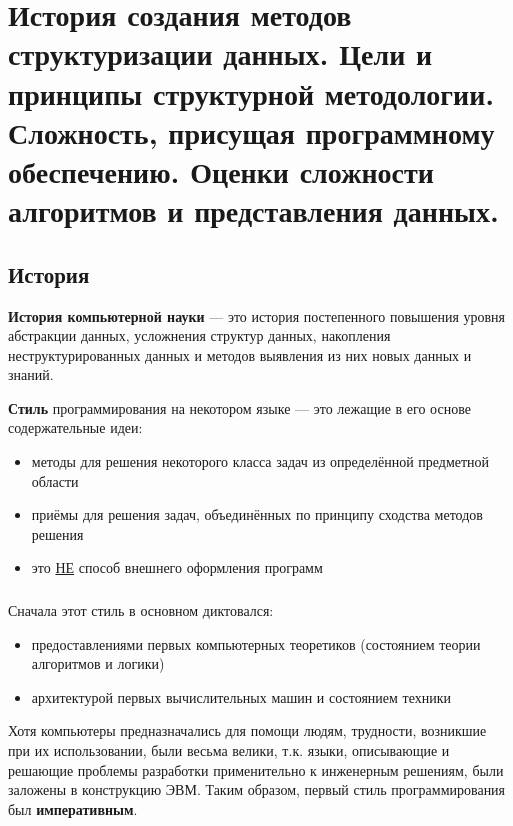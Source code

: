 \section{История создания методов структуризации данных. Цели и принципы структурной методологии. Сложность, присущая программному обеспечению. Оценки сложности алгоритмов и представления данных.}

\subsection{История}
\textbf{История компьютерной науки} --- это история постепенного повышения уровня абстракции данных, усложнения структур данных, накопления неструктурированных данных и методов выявления из них новых данных и знаний.

\textbf{Стиль} программирования на некотором языке ---  это лежащие в его основе содержательные идеи:
\begin{itemize}
  \item методы для решения некоторого класса задач из определённой предметной области
  \item приёмы для решения задач, объединённых по принципу сходства методов решения
  \item это \underline{НЕ} способ внешнего оформления программ
\end{itemize}

\subsubsection*{}
Сначала этот стиль в основном диктовался:
\begin{itemize}
  \item предоставлениями первых компьютерных теоретиков (состоянием теории алгоритмов и логики)
  \item архитектурой первых вычислительных машин и состоянием техники
\end{itemize}
Хотя компьютеры предназначались для помощи людям, трудности, возникшие при их использовании, были весьма велики, т.к. языки, описывающие и решающие проблемы разработки применительно к инженерным решениям, были заложены в конструкцию ЭВМ. Таким образом, первый стиль программирования был \textbf{императивным}. 

